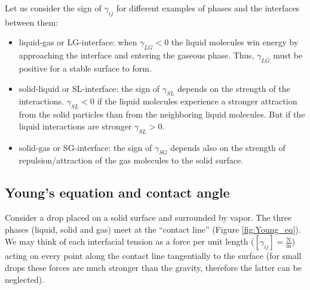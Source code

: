 Let us consider the sign of $\gamma_{ij}$ for different examples
of phases and the interfaces between them:

\begin{itemize}
\item liquid-gas or LG-interface: when $\gamma_{LG}<0$ the liquid molecules
win energy by approaching the interface and entering the gaseous phase.
Thus, $\gamma_{LG}$ must be positive for a stable surface to form.
\item solid-liquid or SL-interface: the sign of $\gamma_{SL}$ depends on
the strength of the interactions. $\gamma_{SL}<0$ if the liquid molecules
experience a stronger attraction from the solid particles than from
the neighboring liquid molecules. But if the liquid interactions are
stronger $\gamma_{SL}>0$.
\item solid-gas or SG-interface: the sign of $\gamma_{SG}$ depends also
on the strength of repulsion/attraction of the gas molecules to the
solid surface. 
\end{itemize}

\subsection{Young's equation and contact angle}

Consider a drop placed on a solid surface and surrounded by vapor.
The three phases (liquid, solid and gas) meet at the ``contact line''
(Figure \ref{fig:Young_eq}). We may think of each interfacial tension
as a force per unit length ($[\gamma_{ij}]=\mathrm{\frac{N}{m}}$)
acting on every point along the contact line tangentially to the surface
(for small drops these forces are much stronger than the gravity,
therefore the latter can be neglected).
